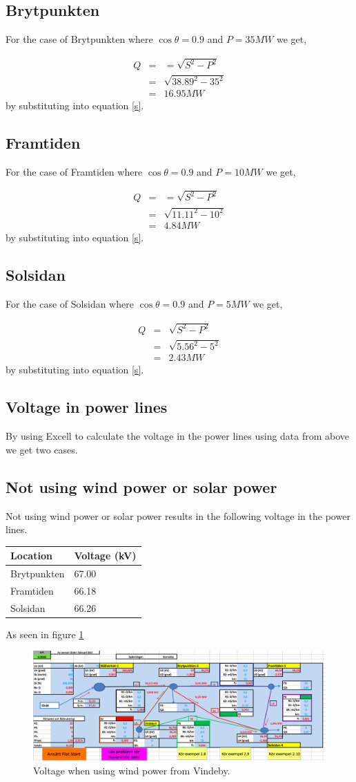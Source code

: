 \documentclass{report}
\newcommand{\case}[1]{\subsection*{#1}}
\begin{document}
\case{Brytpunkten}
For the case of Brytpunkten where $\cos\theta = 0.9$ and $P = 35 MW$ we get,
 
\begin{eqnarray}
Q&=&   = \sqrt{S^2 - P^2}\\
&=& \sqrt{38.89^2 - 35^2} \\
&=& 16.95 MW \label{res}
\end{eqnarray} 
by substituting into equation \ref{s}.

\case{Framtiden}
For the case of Framtiden where $\cos\theta = 0.9$ and $P = 10 MW$ we get,
 
\begin{eqnarray}
Q&=&   = \sqrt{S^2 - P^2}\\
&=& \sqrt{11.11^2 - 10^2} \\
&=& 4.84 MW \label{res}
\end{eqnarray} 
by substituting into equation \ref{s}.

\case{Solsidan}
For the case of Solsidan where $\cos\theta = 0.9$ and $P = 5 MW$ we get,
 
\begin{eqnarray}
Q&=&  \sqrt{S^2 - P^2}\\
&=& \sqrt{5.56^2 - 5^2} \\
&=& 2.43 MW \label{res}
\end{eqnarray} by substituting into equation \ref{s}.

\subsection{Voltage in power lines}
By using Excell to calculate the voltage in the power lines using data from above we get two cases.

\case{Not using wind power or solar power}
Not using wind power or solar power results in the following voltage in the power lines. 

\begin{table}[H] 
\begin{tabular}{ll}
\toprule
Location & Voltage (kV) \\
\midrule
Brytpunkten & 67.00\\
Framtiden  &  66.18\\
Solsidan & 66.26\\
\bottomrule
\end{tabular} 
\end{table} 

As seen in figure \ref{fig_utan_vindeby}
\begin{figure}[h]
\label{fig_utan_vindeby}
\includegraphics[width=\linewidth]{utan_vindeby.png}
\caption{Voltage when using wind power from Vindeby.} 
\end{figure}
\end{document}
